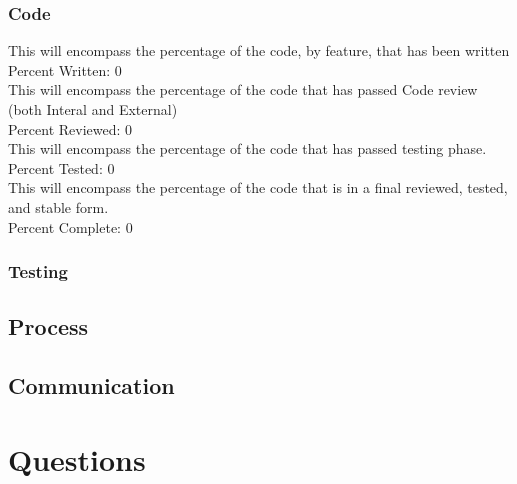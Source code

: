 \documentclass{article}
\begin{document}
\subsubsection{Code}
This will encompass the percentage of the code, by feature, that has been written\\
Percent Written:	0\\
This will encompass the percentage of the code that has passed Code review (both Interal and External)\\
Percent Reviewed:	0\\
This will encompass the percentage of the code that has passed testing phase.\\
Percent Tested:		0\\
This will encompass the percentage of the code that is in a final reviewed, tested, and stable form.\\
Percent Complete:	0\\


\subsubsection{Testing}
\subsection{Process}
\subsection{Communication}

\clearpage

\section{Questions}
\end{document}
